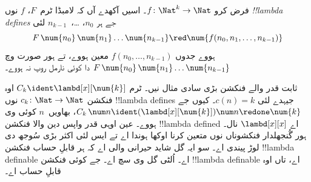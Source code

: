 \documentclass[../../../include/open-logic-section]{subfiles}
\begin{document}
\begin{defn}
فرض کرو $f\colon \Nat^k \to \Nat$۔ اسیں آکھدے آں کہ
لامبڈا ٹرم~$F$، $f$ نوں \emph{!!{lambda define}s} جے ہر
$n_0$، \dots،~$n_{k-1}$ لئی
\[
F \, \num{n_0} \, \num{n_1} \dots \num{n_{k-1}} \red \num{f(n_0, n_1, \dots,
  n_{k-1})}
\]
ہووے جدوں $f(n_0, \dots, n_{k-1})$ معین ہووے، تے ہور صورت
وچ $F \, \num{n_0} \,
\num{n_1} \dots \num{n_{k-1}}$ دا کوئی نارمل روپ نہ ہووے۔
\end{defn}

ثابت قدر والے فنکشن بڑی سادی مثال نیں۔ ٹرم $C_k \ident
\lambd[x][\num{k}]$ اوہ فنکشن $c_k\colon \Nat \to
\Nat$ نوں !!{lambda define}s جیہدے لئی $c(n) = k$۔ کیوں جے $C_k \, \num n \ident
(\lambd[x][\num{k}])\num n \redone \num{k}$، بھاویں~$n$ کوئی
وی ہووے۔ عین اوہی قدر واپس دین والا فنکشن !!{lambda defined}
اے $\lambd[x][x]$ نال۔ ہور گُنجھلدار فنکشوناں نوں متعین کرنا
اوکھا ہوندا اے تے ایس لئی اکثر بڑی سُوجھ دی لوڑ پیندی اے۔
سو ایہ گل شاید حیرانی والی اے کہ ہر قابلِ حساب فنکشن
!!{lambda definable} اے۔ اُلٹی گل وی سچ اے۔ جے کوئی فنکشن
!!{lambda definable} اے، تاں اوہ قابلِ حساب اے۔
\end{document}
